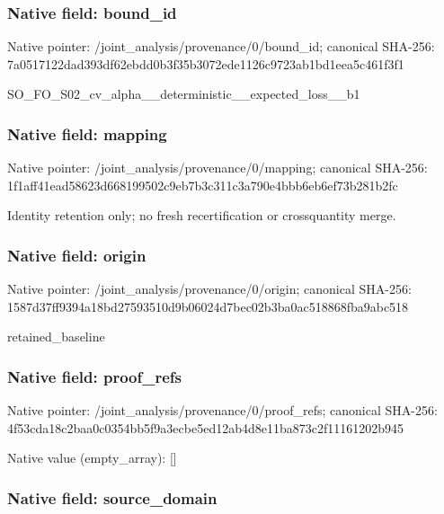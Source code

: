 \documentclass[10pt,a4paper]{article}
\begin{document}
\subsubsection{Native field: bound\_id}


Native pointer: /joint\_analysis/provenance/0/bound\_id; canonical SHA-256: 7a0517122dad393df62ebdd0\allowbreak{}b3f35b3072ede1126c9723ab\allowbreak{}1bd1eea5c461f3f1


SO\_FO\_S02\_cv\_alpha\_\_dete\allowbreak{}rministic\_\_expected\_loss\allowbreak{}\_\_b1


\subsubsection{Native field: mapping}


Native pointer: /joint\_analysis/provenance/0/mapping; canonical SHA-256: 1f1aff41ead58623d6681995\allowbreak{}02c9eb7b3c311c3a790e4bbb\allowbreak{}6eb6ef73b281b2fc


Identity retention only; no fresh recertification or crossquantity merge.


\subsubsection{Native field: origin}


Native pointer: /joint\_analysis/provenance/0/origin; canonical SHA-256: 1587d37ff9394a18bd275935\allowbreak{}10d9b06024d7bec02b3ba0ac\allowbreak{}518868fba9abc518


retained\_baseline


\subsubsection{Native field: proof\_refs}


Native pointer: /joint\_analysis/provenance/0/proof\_refs; canonical SHA-256: 4f53cda18c2baa0c0354bb5f\allowbreak{}9a3ecbe5ed12ab4d8e11ba87\allowbreak{}3c2f11161202b945



Native value (empty\_array): []



\subsubsection{Native field: source\_domain}
\end{document}
